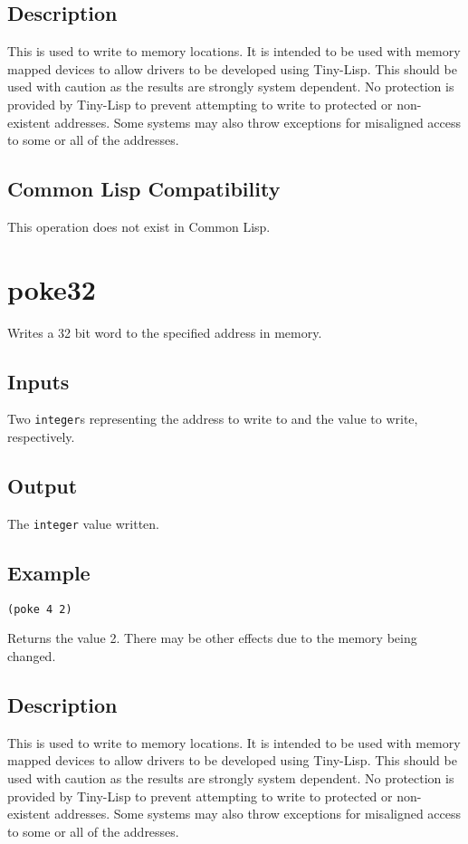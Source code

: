 \documentclass[10pt, openany]{book}
\newcommand{\datatype}[1]{\texttt{#1}}
\newcommand{\tl}{Tiny-Lisp}
\newcommand{\cl}{Common Lisp}
\begin{document}
\subsection{Description}
This is used to write to memory locations.  It is intended to be used with memory mapped devices to allow drivers to be developed using \tl{}.  This should be used with caution as the results are strongly system dependent.  No protection is provided by \tl{} to prevent attempting to write to protected or non-existent addresses.  Some systems may also throw exceptions for misaligned access to some or all of the addresses.
\subsection{Common Lisp Compatibility}
This operation does not exist in \cl.

\section{poke32}
Writes a 32 bit word to the specified address in memory.
\subsection{Inputs}
Two \datatype{integer}s representing the address to write to and the value to write, respectively.
\subsection{Output}
The \datatype{integer} value written.
\subsection{Example}
\begin{lstlisting}
(poke 4 2)
\end{lstlisting}
Returns the value 2.  There may be other effects due to the memory being changed.
\subsection{Description}
This is used to write to memory locations.  It is intended to be used with memory mapped devices to allow drivers to be developed using \tl{}.  This should be used with caution as the results are strongly system dependent.  No protection is provided by \tl{} to prevent attempting to write to protected or non-existent addresses.  Some systems may also throw exceptions for misaligned access to some or all of the addresses.
\end{document}

